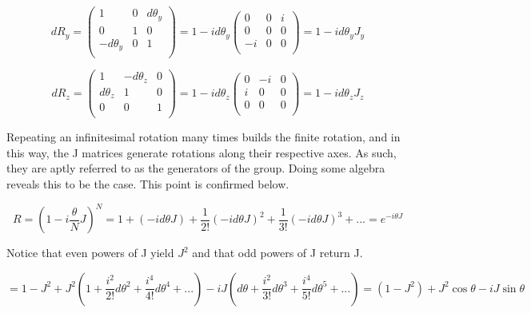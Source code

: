 \begin{equation}
dR_y = 
\begin{pmatrix}
1 & 0 & d\theta_y \\
0 & 1 & 0 \\
-d\theta_y & 0 & 1 \\
\end{pmatrix}
= 1 - id\theta_y
\begin{pmatrix}
0 & 0 & i \\
0 & 0 & 0 \\
-i & 0 & 0 \\
\end{pmatrix}
= 1 - id\theta_y J_y
\end{equation}

\begin{equation}
dR_z = 
\begin{pmatrix}
1 & -d\theta_z & 0 \\
d\theta_z & 1 & 0 \\
0 & 0 & 1 \\
\end{pmatrix}
= 1 - id\theta_z 
\begin{pmatrix}
0 & -i & 0 \\
i & 0 & 0 \\
0 & 0 & 0 \\
\end{pmatrix}
= 1 - id\theta_z J_z
\end{equation}

Repeating an infinitesimal rotation many times builds the finite rotation, and in this way, the J matrices generate rotations along their respective axes.  As such, they are aptly referred to as the generators of the group. Doing some algebra reveals this to be the case. This point is confirmed below.

\begin{equation}
R = (1 - i\frac{\theta}{N} J)^{N} = 1 + (-id\theta J) + \frac{1}{2!}(-id\theta J)^2 + \frac{1}{3!}(-id\theta J)^3 + ... = e^{-i\theta J} 
\end{equation}

Notice that even powers of J yield $J^2$ and that odd powers of J return J.

\begin{equation}
  = 1 - J^2 + J^2(1 + \frac{i^2}{2!} d\theta^2 + \frac{i^4}{4!} d\theta^4 + ...) - iJ(d\theta + \frac{i^2}{3!}d\theta^3 + \frac{i^4}{5!}d\theta^5 + ...) 
  = (1-J^2) + J^2 \cos\theta - iJ\sin\theta
\end{equation}

